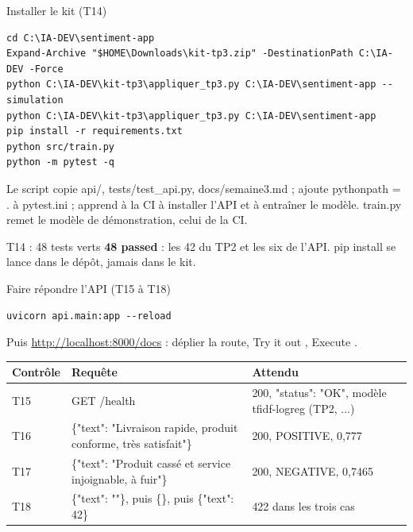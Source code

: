\documentclass[aspectratio=169,11pt]{beamer}
\newcommand{\co}[1]{{\ttfamily\hyphenchar\font=45\relax #1}}
\begin{document}
\begin{frame}[fragile]{Installer le kit (T14)}
\begin{lstlisting}
cd C:\IA-DEV\sentiment-app
Expand-Archive "$HOME\Downloads\kit-tp3.zip" -DestinationPath C:\IA-DEV -Force
python C:\IA-DEV\kit-tp3\appliquer_tp3.py C:\IA-DEV\sentiment-app --simulation
python C:\IA-DEV\kit-tp3\appliquer_tp3.py C:\IA-DEV\sentiment-app
pip install -r requirements.txt
python src/train.py
python -m pytest -q
\end{lstlisting}
\small Le script copie \co{api/}, \co{tests/test\_api.py}, \co{docs/semaine3.md} ; ajoute \co{pythonpath = .}
à \co{pytest.ini} ; apprend à la CI à installer l'API et à entraîner le modèle. \co{train.py} remet le modèle
de démonstration, celui de la CI.
\begin{exampleblock}{T14 : 48 tests verts}
\textbf{48 passed} : les 42 du TP2 et les six de l'API. \co{pip install} se lance dans le dépôt, jamais dans
le kit.
\end{exampleblock}
\end{frame}

\begin{frame}[fragile]{Faire répondre l'API (T15 à T18)}
\begin{lstlisting}
uvicorn api.main:app --reload
\end{lstlisting}
\small Puis \url{http://localhost:8000/docs} : déplier la route, \og Try it out \fg{}, \og Execute \fg{}.

\scriptsize
\begin{tabularx}{\textwidth}{@{}l X X@{}}
\toprule
\textbf{Contrôle} & \textbf{Requête} & \textbf{Attendu} \\
\midrule
T15 & \co{GET /health} & 200, \co{"status": "OK"}, modèle \co{tfidf-logreg (TP2, ...)} \\
T16 & \co{\{"text": "Livraison rapide, produit conforme, très satisfait"\}} & 200, \co{POSITIVE}, 0,777 \\
T17 & \co{\{"text": "Produit cassé et service injoignable, à fuir"\}} & 200, \co{NEGATIVE}, 0,7465 \\
T18 & \co{\{"text": ""\}}, puis \co{\{\}}, puis \co{\{"text": 42\}} & 422 dans les trois cas \\
\bottomrule
\end{tabularx}
\end{frame}
\end{document}
